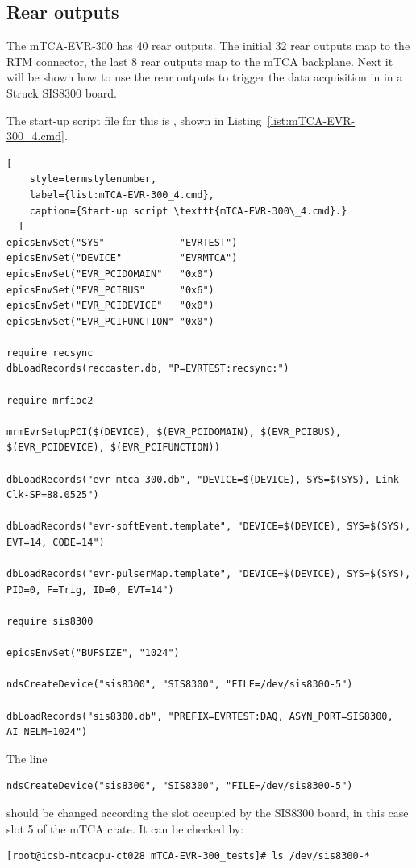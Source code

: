 \documentclass[11pt
  , a4paper
  , article
  , oneside
  , showtrims
]{memoir}
\begin{document}
\subsection{Rear outputs}
The mTCA-EVR-300 has 40 rear outputs. The initial 32 rear outputs map to the RTM connector, the last 8 rear outputs map to the mTCA backplane. Next it will be shown how to use the rear outputs to trigger the data acquisition in in a Struck SIS8300 board.

The start-up script file for this is , shown in Listing~\ref{list:mTCA-EVR-300_4.cmd}. 
\begin{lstlisting}[ 
    style=termstylenumber,
    label={list:mTCA-EVR-300_4.cmd},
    caption={Start-up script \texttt{mTCA-EVR-300\_4.cmd}.}
  ]
epicsEnvSet("SYS"             "EVRTEST")
epicsEnvSet("DEVICE"          "EVRMTCA")
epicsEnvSet("EVR_PCIDOMAIN"   "0x0")
epicsEnvSet("EVR_PCIBUS"      "0x6")
epicsEnvSet("EVR_PCIDEVICE"   "0x0")
epicsEnvSet("EVR_PCIFUNCTION" "0x0")

require recsync
dbLoadRecords(reccaster.db, "P=EVRTEST:recsync:")

require mrfioc2

mrmEvrSetupPCI($(DEVICE), $(EVR_PCIDOMAIN), $(EVR_PCIBUS), $(EVR_PCIDEVICE), $(EVR_PCIFUNCTION))

dbLoadRecords("evr-mtca-300.db", "DEVICE=$(DEVICE), SYS=$(SYS), Link-Clk-SP=88.0525")

dbLoadRecords("evr-softEvent.template", "DEVICE=$(DEVICE), SYS=$(SYS), EVT=14, CODE=14")

dbLoadRecords("evr-pulserMap.template", "DEVICE=$(DEVICE), SYS=$(SYS), PID=0, F=Trig, ID=0, EVT=14")

require sis8300

epicsEnvSet("BUFSIZE", "1024")

ndsCreateDevice("sis8300", "SIS8300", "FILE=/dev/sis8300-5")

dbLoadRecords("sis8300.db", "PREFIX=EVRTEST:DAQ, ASYN_PORT=SIS8300, AI_NELM=1024")
\end{lstlisting}

The line 
\begin{lstlisting}[style=termstyle]
ndsCreateDevice("sis8300", "SIS8300", "FILE=/dev/sis8300-5")
\end{lstlisting}
should be changed according the slot occupied by the SIS8300 board, in this case slot 5 of the mTCA crate. It can be checked by:
\begin{lstlisting}[style=termstyle]
[root@icsb-mtcacpu-ct028 mTCA-EVR-300_tests]# ls /dev/sis8300-*
\end{lstlisting}
\end{document}
